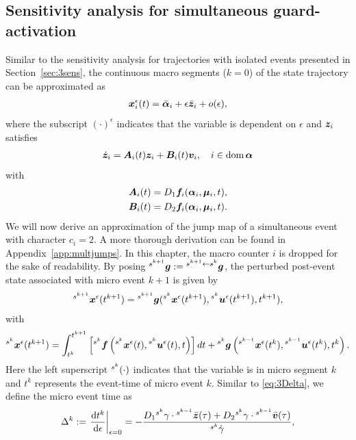 \documentclass[../DC2019003Bouma.tex]{subfiles}
\begin{document}
\subsection{Sensitivity analysis for simultaneous guard-activation}
Similar to the sensitivity analysis for trajectories with isolated events presented in Section~\ref{sec:3sens}, the continuous macro segments ($k=0$) of the state trajectory can be approximated as
\begin{align}
{\boldsymbol{x}}_i^\epsilon(t) = \bar{\boldsymbol{\alpha}}_i + \epsilon\bar{{\boldsymbol{z}}}_i + o(\epsilon),
\end{align}
where the subscript $(\cdot)^\epsilon$ indicates that the variable is dependent on $\epsilon$ and ${\boldsymbol{z}}_i$ satisfies
\begin{align}
\dot{{\boldsymbol{z}}}_i = {\boldsymbol{A}}_i(t){\boldsymbol{z}}_i +{\boldsymbol{B}}_i(t){\boldsymbol{v}}_i,\quad i\in \operatorname{\textnormal{dom}}\boldsymbol{\alpha}
\end{align}
with
\begin{align*}
{\boldsymbol{A}}_i(t) &= D_1{\boldsymbol{f}}_i(\boldsymbol{\alpha}_i,\boldsymbol{\mu}_i,t),\\
{\boldsymbol{B}}_i(t) &= D_2{\boldsymbol{f}}_i(\boldsymbol{\alpha}_i,\boldsymbol{\mu}_i,t).
\end{align*}
We will now derive an approximation of the jump map of a simultaneous event with character $c_i = 2$. A more thorough derivation can be found in Appendix~\ref{app:multjumps}. In this chapter, the macro counter $i$ is dropped for the sake of readability. By posing $\hspace{0cm}^{s^{k+1}}{\boldsymbol{g}} := \hspace{0cm}^{s^{k+1}\leftarrow s^k}{\boldsymbol{g}}$, the perturbed post-event state associated with micro event $k+1$ is given by
\begin{align}
\hspace{0cm}^{s^{k+1}}{\boldsymbol{x}}^\epsilon(t^{k+1}) = \hspace{0cm}^{s^{k+1}}{\boldsymbol{g}}(\hspace{0cm}^{s^{k}}{\boldsymbol{x}}^\epsilon(t^{k+1}),\hspace{0cm}^{s^{k}}{\boldsymbol{u}}^\epsilon(t^{k+1}),t^{k+1}),\label{eq:4xe012}
\end{align}
with
\begin{align}
\hspace{0cm}^{s^{k}}{\boldsymbol{x}}^\epsilon(t^{k+1}) = \int_{t^{k}}^{t^{k+1}}\left[\hspace{0cm}^{s^{k}}{\boldsymbol{f}}\left(\hspace{0cm}^{s^{k}}{\boldsymbol{x}}^\epsilon(t),\hspace{0cm}^{s^{k}}{\boldsymbol{u}}^\epsilon(t),t\right)\right]dt + \hspace{0cm}^{s^{k}}{\boldsymbol{g}}\left(\hspace{0cm}^{s^{k-1}}{\boldsymbol{x}}^\epsilon(t^{k}),\hspace{0cm}^{s^{k-1}}{\boldsymbol{u}}^\epsilon(t^{k}),t^{k}\right).\label{eq:4xe01}
\end{align}
Here the left superscript $\hspace{0cm}^{s^k}(\cdot)$ indicates that the variable is in micro segment $k$ and $t^k$ represents the event-time of micro event $k$. Similar to \eqref{eq:3Delta}, we define the micro event time as
\begin{align}
\Delta^k := \left.\frac{\textnormal{d} t^k}{\textnormal{d}\epsilon}\right|_{\epsilon=0} = -\frac{D_1\hspace{0cm}^{s^{k}}\gamma\cdot\hspace{0cm}^{s^{k-1}}\bar{{\boldsymbol{z}}}(\tau) + D_2\hspace{0cm}^{s^{k}}\gamma\cdot\hspace{0cm}^{s^{k-1}}\bar{{\boldsymbol{v}}}(\tau)}{\hspace{0cm}^{s^{k}}\dot{\gamma}},\label{eq:4Deltak}
\end{align}
\end{document}
